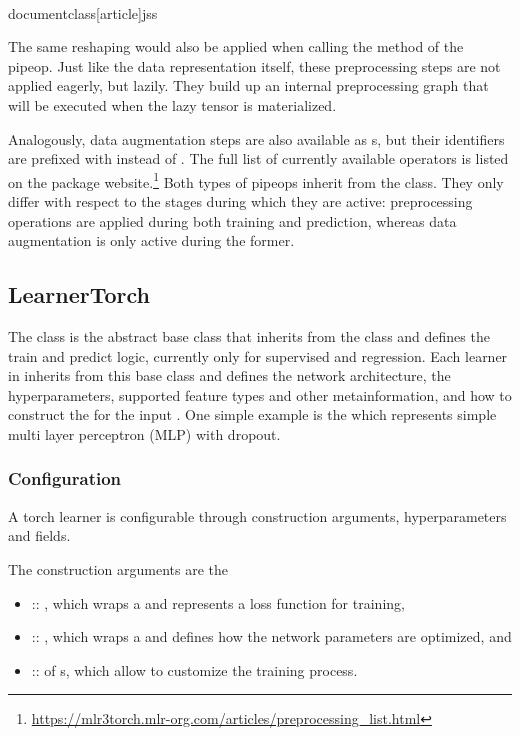 \\documentclass[article]{jss}
\theoremstyle{definition}
\begin{document}
The same reshaping would also be applied when calling the  method of the pipeop.
Just like the data representation itself, these preprocessing steps are not applied eagerly, but lazily.
They build up an internal preprocessing graph that will be executed when the lazy tensor is materialized.

Analogously, data augmentation steps are also available as s, but their identifiers are prefixed with  instead of .
The full list of currently available operators is listed on the package website.\footnote{\url{https://mlr3torch.mlr-org.com/articles/preprocessing\_list.html}}
Both types of pipeops inherit from the  class.
They only differ with respect to the stages during which they are active: preprocessing operations are applied during both training and prediction, whereas data augmentation is only active during the former.


\subsection{LearnerTorch}

The   class is the abstract base class that inherits from the  class and defines the train and predict logic, currently only for supervised and regression.
Each learner in  inherits from this base class and defines the network architecture, the hyperparameters, supported feature types and other metainformation, and how to construct the  for the input .
One simple example is the  which represents simple multi layer perceptron (MLP) with dropout.

\subsubsection{Configuration}

A torch learner is configurable through construction arguments, hyperparameters and fields.

The construction arguments are the
\begin{itemize}
    \item {} :: , which wraps a  and represents a loss function for training,
    \item {} :: , which wraps a  and defines how the network parameters are optimized, and
    \item {} ::  of s, which allow to customize the training process.
\end{itemize}
\end{document}
